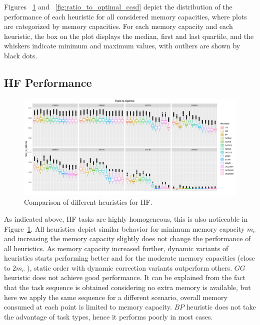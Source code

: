 \documentclass[sigconf]{acmart}
\begin{document}
{		
		Figures ~\ref{fig:ratio_to_optimal_hf} and ~\ref{fig:ratio_to_optimal_ccsd} depict the distribution of the performance of each heuristic for all considered memory capacities, where plots are categorized by memory capacities. For each memory capacity and each heuristic, the box on the plot displays the median, first and last quartile, and the whiskers indicate minimum and maximum values, with outliers are shown by black dots.
		\subsection{HF Performance}	
		\begin{figure}[htb]
		  \includegraphics[scale=0.5]{./all-binpack/ratio_to_optimal_selected_hf.pdf}
			\caption{Comparison of different heuristics for HF.}
			\label{fig:ratio_to_optimal_hf}
		\end{figure}
		As indicated above, HF tasks are highly homogeneous, this is also noticeable in Figure~\ref{fig:ratio_to_optimal_hf}. All heuristics depict similar behavior for minimum memory capacity $m_c$ and increasing the memory capacity slightly does not change the performance of all heuristics. As memory capacity increased further, dynamic variants of heuristics starts performing better and for the moderate memory capacities (close to $2m_c$ ), static order with dynamic correction variants outperform others. $GG$ heuristic does not achieve good performance. It can be explained from the fact that the task sequence is obtained considering no extra memory is available, but here we apply the same sequence for a different scenario, overall memory consumed at each point is limited to memory capacity. $BP$ heuristic does not take the advantage of task types, hence it performs poorly in most cases.
		
}
\end{document}
